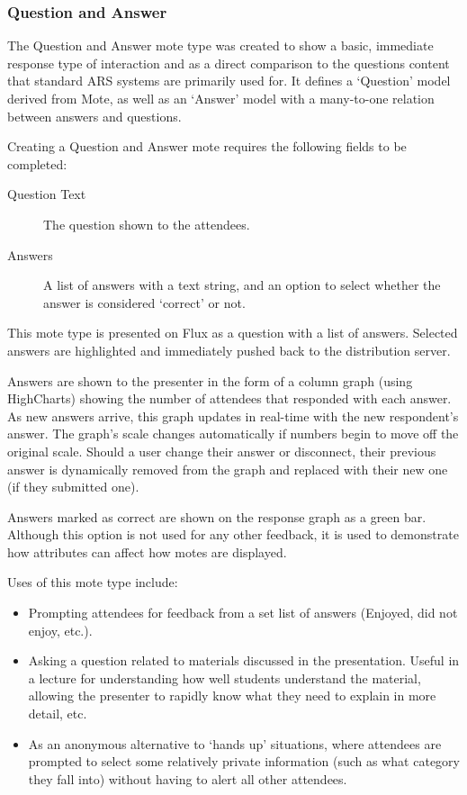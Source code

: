 \documentclass[a4papert,11pt,notitlepage]{article}
\begin{document}
\subsubsection{Question and Answer}
The Question and Answer mote type was created to show a basic, immediate response type of interaction and as a direct comparison to the questions content that standard ARS systems are primarily used for. It defines a `Question' model derived from Mote, as well as an `Answer' model with a many-to-one relation between answers and questions.

Creating a Question and Answer mote requires the following fields to be completed:
\begin{description}
\item[Question Text] The question shown to the attendees.
\item[Answers] A list of answers with a text string, and an option to select whether the answer is considered `correct' or not.
\end{description}

This mote type is presented on Flux as a question with a list of answers. Selected answers are highlighted and immediately pushed back to the distribution server.

Answers are shown to the presenter in the form of a column graph (using HighCharts) showing the number of attendees that responded with each answer. As new answers arrive, this graph updates in real-time with the new respondent's answer. The graph's scale changes automatically if numbers begin to move off the original scale. Should a user change their answer or disconnect, their previous answer is dynamically removed from the graph and replaced with their new one (if they submitted one).

Answers marked as correct are shown on the response graph as a green bar. Although this option is not used for any other feedback, it is used to demonstrate how attributes can affect how motes are displayed.

Uses of this mote type include:
\begin{itemize}
\item Prompting attendees for feedback from a set list of answers (Enjoyed, did not enjoy, etc.). 
\item Asking a question related to materials discussed in the presentation. Useful in a lecture for understanding how well students understand the material, allowing the presenter to rapidly know what they need to explain in more detail, etc.
\item As an anonymous alternative to `hands up' situations, where attendees are prompted to select some relatively private information (such as what category they fall into) without having to alert all other attendees.
\end{itemize}
\end{document}

